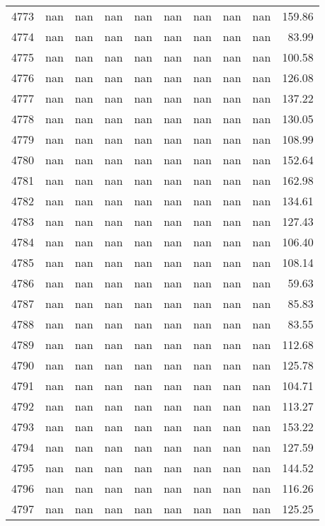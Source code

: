 \begin{tabular}{lrrrrrrrrr}
4773 & nan & nan & nan & nan & nan & nan & nan & nan & 159.86 \\
4774 & nan & nan & nan & nan & nan & nan & nan & nan & 83.99 \\
4775 & nan & nan & nan & nan & nan & nan & nan & nan & 100.58 \\
4776 & nan & nan & nan & nan & nan & nan & nan & nan & 126.08 \\
4777 & nan & nan & nan & nan & nan & nan & nan & nan & 137.22 \\
4778 & nan & nan & nan & nan & nan & nan & nan & nan & 130.05 \\
4779 & nan & nan & nan & nan & nan & nan & nan & nan & 108.99 \\
4780 & nan & nan & nan & nan & nan & nan & nan & nan & 152.64 \\
4781 & nan & nan & nan & nan & nan & nan & nan & nan & 162.98 \\
4782 & nan & nan & nan & nan & nan & nan & nan & nan & 134.61 \\
4783 & nan & nan & nan & nan & nan & nan & nan & nan & 127.43 \\
4784 & nan & nan & nan & nan & nan & nan & nan & nan & 106.40 \\
4785 & nan & nan & nan & nan & nan & nan & nan & nan & 108.14 \\
4786 & nan & nan & nan & nan & nan & nan & nan & nan & 59.63 \\
4787 & nan & nan & nan & nan & nan & nan & nan & nan & 85.83 \\
4788 & nan & nan & nan & nan & nan & nan & nan & nan & 83.55 \\
4789 & nan & nan & nan & nan & nan & nan & nan & nan & 112.68 \\
4790 & nan & nan & nan & nan & nan & nan & nan & nan & 125.78 \\
4791 & nan & nan & nan & nan & nan & nan & nan & nan & 104.71 \\
4792 & nan & nan & nan & nan & nan & nan & nan & nan & 113.27 \\
4793 & nan & nan & nan & nan & nan & nan & nan & nan & 153.22 \\
4794 & nan & nan & nan & nan & nan & nan & nan & nan & 127.59 \\
4795 & nan & nan & nan & nan & nan & nan & nan & nan & 144.52 \\
4796 & nan & nan & nan & nan & nan & nan & nan & nan & 116.26 \\
4797 & nan & nan & nan & nan & nan & nan & nan & nan & 125.25 \\

\end{tabular}
